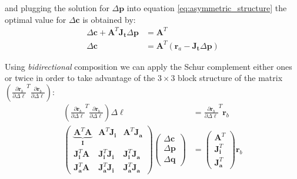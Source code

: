 and plugging the solution for $\Delta\mathbf{p}$ into equation \ref{eq:asymmetric_structure} the optimal value for $\Delta\mathbf{c}$ is obtained by:
\begin{equation}
    \begin{aligned}
        \Delta \mathbf{c} + \mathbf{A}^T\mathbf{J}_{\mathbf{t}}\Delta\mathbf{p} & = \mathbf{A}^T
        \\
        \Delta \mathbf{c} & = \mathbf{A}^T \left( \mathbf{r}_a - \mathbf{J}_{\mathbf{t}} \Delta\mathbf{p} \right)
    \label{eq:asymmetric_schur_solution2}
    \end{aligned}
\end{equation}

Using \emph{bidirectional} composition we can apply the Schur complement either ones or twice in order to take advantage of the $3\times3$ block structure of the matrix $\left( \frac{\partial \mathbf{r}_b}{\partial \Delta \boldsymbol{\ell}}^T \frac{\partial \mathbf{r}_b}{\partial \Delta \boldsymbol{\ell}} \right)$:
\begin{equation}
    \begin{aligned}
    	\left( \frac{\partial \mathbf{r}_b}{\partial \Delta \boldsymbol{\ell}}^T \frac{\partial \mathbf{r}_b}{\partial \Delta \boldsymbol{\ell}} \right) \Delta \boldsymbol{\ell} & = \frac{\partial \mathbf{r}_b}{\partial \Delta \boldsymbol{\ell}}^T \mathbf{r}_b
    	\\
        \left(\begin{array}{c|cc}
            \underbrace{\mathbf{A}^T \mathbf{A}}_{\mathbf{I}} & \mathbf{A}^T \mathbf{J}_{\mathbf{i}} & \mathbf{A}^T \mathbf{J}_{\mathbf{a}} 
            \\ \hline
            \mathbf{J}_{\mathbf{i}}^T \mathbf{A} & \mathbf{J}_{\mathbf{i}}^T \mathbf{J}_{\mathbf{i}} & \mathbf{J}_{\mathbf{i}}^T \mathbf{J}_{\mathbf{a}}
            \\ 
            \mathbf{J}_{\mathbf{a}}^T \mathbf{A} & \mathbf{J}_{\mathbf{a}}^T \mathbf{J}_{\mathbf{i}} & \mathbf{J}_{\mathbf{a}}^T \mathbf{J}_{\mathbf{a}}  
        \end{array} \right)
        \begin{pmatrix}
            \Delta\mathbf{c} 
            \\ \hline
            \Delta\mathbf{p}
            \\ 
            \Delta\mathbf{q}
        \end{pmatrix}
        & = 
        \begin{pmatrix}
            \mathbf{A}^T
            \\ \hline
            \mathbf{J}_{\mathbf{i}}^T
            \\ 
            \mathbf{J}_{\mathbf{a}}^T
        \end{pmatrix} \mathbf{r}_b
    \label{eq:bidirectional_structure}
    \end{aligned}
\end{equation}

